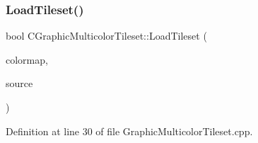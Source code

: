 \subsubsection{\texorpdfstring{Load\+Tileset()}{LoadTileset()}}
{\footnotesize\ttfamily bool C\+Graphic\+Multicolor\+Tileset\+::\+Load\+Tileset (\begin{DoxyParamCaption}\item[{std\+::shared\+\_\+ptr$<$ \hyperlink{classCGraphicRecolorMap}{C\+Graphic\+Recolor\+Map} $>$}]{colormap,  }\item[{std\+::shared\+\_\+ptr$<$ \hyperlink{classCDataSource}{C\+Data\+Source} $>$}]{source }\end{DoxyParamCaption})}



Definition at line 30 of file Graphic\+Multicolor\+Tileset.\+cpp.



